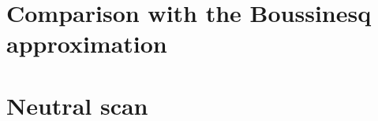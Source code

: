 \documentclass[12pt,a4paper,oneside,openright]{report} %
\begin{document}
\chapter{Comparison with the Boussinesq approximation}
\label{chap:compBouss}

\chapter{Neutral scan}
\label{chap:neutScan}


% 
%
% 
%
% 
%
% 
%
% 
%
% 
%
% 
%
\end{document}

